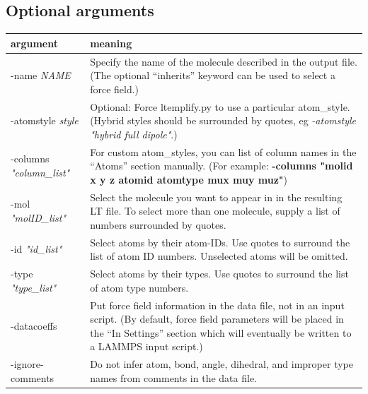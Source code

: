 \documentclass[11pt]{article}
\begin{document}
\pagebreak

\subsection{ Optional arguments }
\label{sec:ltemplify_args_table}
\begin{tabular}[h]{l|p{10cm}}
\textbf{argument} & \textbf{meaning}
\\
\hline
\hline

-name \textit{NAME}  &
Specify the name of the molecule described in the output file.
(The optional ``inherits'' keyword can be used to select a force field.)
\\
\hline

-atomstyle \textit{style}
&
Optional: Force ltemplify.py to use a particular atom\_style.
(Hybrid styles should be surrounded by quotes, eg
\textit{-atomstyle "hybrid full dipole"}.)
\\
\hline

-columns \textit{"column\_list"}  &
For custom atom\_styles, you can list of column names in the ``Atoms''
section manually.
(For example: \textbf{-columns "molid x y z atomid atomtype mux muy muz"})
\\
\hline

-mol \textit{"molID\_list"}
&
Select the molecule you want to appear in in the resulting LT file.
To select more than one molecule, supply a list of numbers surrounded
by quotes.
\\
\hline

-id \textit{"id\_list"}
&
Select atoms by their atom-IDs.
Use quotes to surround the list of atom ID numbers.
Unselected atoms will be omitted.
\\
\hline

-type \textit{"type\_list"}
&
Select atoms by their types.
Use quotes to surround the list of atom type numbers.
\\
\hline

-datacoeffs
&
Put force field information in the data file, not in an input script.
(By default, force field parameters will be placed in the ``In Settings''
 section which will eventually be written to a LAMMPS input script.)
\\
\hline

-ignore-comments
&
Do not infer atom, bond, angle, dihedral, and improper type names
from comments in the data file.
\\
\hline


\end{tabular}
\end{document}
